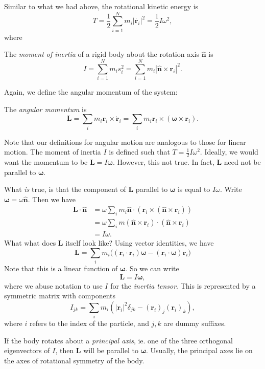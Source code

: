 \documentclass[a4paper]{article}
\begin{document}
Similar to what we had above, the rotational kinetic energy is
\[
  T = \frac{1}{2}\sum_{i = 1}^N m_i|\dot{\mathbf{r}_i}|^2 = \frac{1}{2}I\omega^2,
\]
where
\begin{defi}
  The \emph{moment of inertia} of a rigid body about the rotation axis $\hat{\mathbf{n}}$ is
  \[
    I = \sum_{i = 1}^N m_is_i^2 = \sum_{i = 1}^N m_i |\hat{\mathbf{n}}\times \mathbf{r}_i|^2.
  \]
\end{defi}
Again, we define the angular momentum of the system:
\begin{defi}
  The \emph{angular momentum} is
  \[
    \mathbf{L} = \sum_i m_i \mathbf{r}_i \times \dot{\mathbf{r}}_i = \sum_i m_i \mathbf{r}_i \times (\boldsymbol\omega \times \mathbf{r}_i).
  \]
\end{defi}
Note that our definitions for angular motion are analogous to those for linear motion. The moment of inertia $I$ is defined such that $T = \frac{1}{2}I\omega^2$. Ideally, we would want the momentum to be $\mathbf{L} = I\boldsymbol \omega$. However, this not true. In fact, $\mathbf{L}$ need not be parallel to $\boldsymbol\omega$.

What \emph{is} true, is that the component of $\mathbf{L}$ parallel to $\boldsymbol\omega$ is equal to $I\omega$. Write $\boldsymbol\omega = \omega\hat{\mathbf{n}}$. Then we have
\begin{align*}
  \mathbf{L} \cdot \hat{\mathbf{n}} &= \omega \sum_i m_i \hat{\mathbf{n}}\cdot (\mathbf{r}_i \times (\hat{\mathbf{n}} \times \mathbf{r}_i))\\
  &= \omega \sum_i m(\hat{\mathbf{n}}\times \mathbf{r}_i)\cdot (\hat{\mathbf{n}} \times \mathbf{r}_i)\\
  &= I\omega.
\end{align*}
What what does $\mathbf{L}$ itself look like? Using vector identities, we have
\[
  \mathbf{L} = \sum_i m_i\big((\mathbf{r}_i\cdot \mathbf{r}_i)\boldsymbol \omega - (\mathbf{r}_i \cdot \boldsymbol\omega)\mathbf{r}_i\big)
\]
Note that this is a linear function of $\boldsymbol\omega$. So we can write
\[
  \mathbf{L} = I\boldsymbol \omega,
\]
where we abuse notation to use $I$ for the \emph{inertia tensor}. This is represented by a symmetric matrix with components
\[
  I_{jk} = \sum_i m_i(|\mathbf{r}_i|^2 \delta_{jk} - (\mathbf{r}_i)_j(\mathbf{r}_i)_k),
\]
where $i$ refers to the index of the particle, and $j, k$ are dummy suffixes.

If the body rotates about a \emph{principal axis}, ie. one of the three orthogonal eigenvectors of $I$, then $\mathbf{L}$ will be parallel to $\boldsymbol\omega$. Usually, the principal axes lie on the axes of rotational symmetry of the body.
\end{document}
